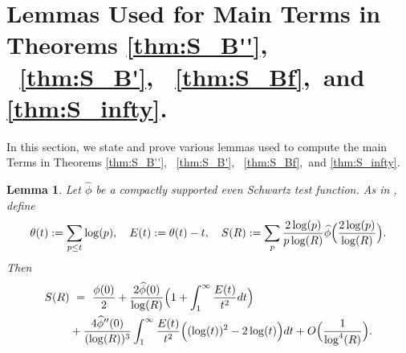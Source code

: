 \documentclass[11pt, reqno]{amsart}
\newtheorem{lemma}[theorem]{Lemma}
\theoremstyle{definition}
\theoremstyle{remark}
\numberwithin{equation}{section}
\renewcommand{\hat}{\widehat}
\begin{document}
\section{Lemmas Used for Main Terms in Theorems \ref{thm:S_B''}, \ \ref{thm:S_B'}, \ \ref{thm:S_Bf},\ and \ref{thm:S_infty}. } \label{appendix Lemmas for main term}
In this section, we state and prove various lemmas used to compute the main Terms in Theorems \ref{thm:S_B''}, \ \ref{thm:S_B'}, \ \ref{thm:S_Bf},\ and \ref{thm:S_infty}.
\begin{lemma}\label{lem:MSwork}
Let \(\hat\phi\) be a compactly supported even Schwartz test function. As in \cite{young2005lower}, define
\[
\theta(t) := \sum_{p\leq t}\log(p), 
\quad E(t) :=\theta(t)-t,
\quad S(R) := \sum_{p} \frac{2\log(p)}{p\log(R)} \hat\phi\Bigl(\frac{2\log(p)}{\log(R)}\Bigr).
\]
Then
\begin{equation}
\begin{aligned}
S(R) & \ = \ \frac{\phi(0)}{2}
+\frac{2\hat\phi(0)}{\log(R)}\Bigl(1+\int_{1}^{\infty}\frac{E(t)}{t^{2}}dt\Bigr)\\
&+\frac{4\hat\phi''(0)}{(\log(R))^{3}}
\int_{1}^{\infty}\frac{E(t)}{t^{2}}\Bigl((\log(t))^{2}-2\log(t)\Bigr)dt
+O\Bigl(\frac{1}{\log^4(R)}\Bigr).
\end{aligned}
\end{equation}
\end{lemma}
\end{document}
